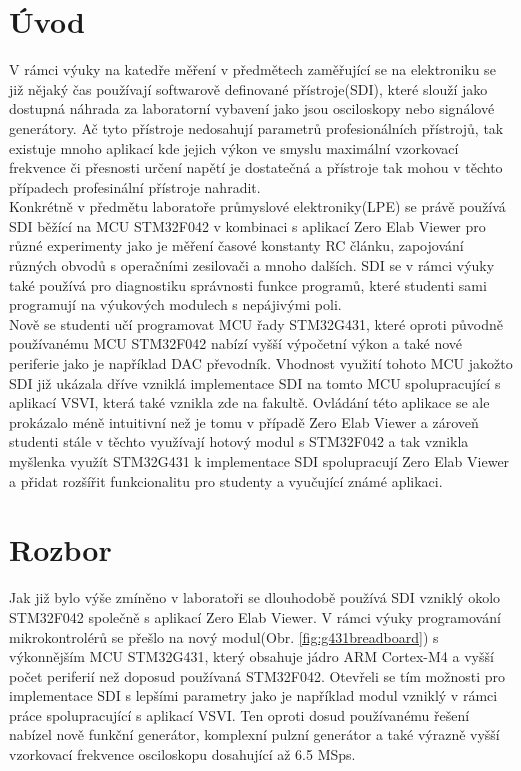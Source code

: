 
\chapter{Úvod}
V rámci výuky na katedře měření v předmětech zaměřující se na elektroniku se již nějaký čas používají softwarově definované přístroje(SDI), které slouží jako dostupná náhrada za laboratorní vybavení jako jsou osciloskopy nebo signálové generátory. Ač tyto přístroje nedosahují parametrů profesionálních přístrojů, tak existuje mnoho aplikací kde jejich výkon ve smyslu maximální vzorkovací frekvence či přesnosti určení napětí je dostatečná a přístroje tak mohou v těchto případech profesinální přístroje nahradit.\\

Konkrétně v předmětu laboratoře průmyslové elektroniky(LPE) se právě používá SDI běžící na MCU STM32F042 v kombinaci s aplikací Zero Elab Viewer pro různé experimenty jako je měření časové konstanty RC článku, zapojování různých obvodů s operačními zesilovači a mnoho dalších. SDI se v rámci výuky také používá pro diagnostiku správnosti funkce programů, které studenti sami programují na výukových modulech s nepájivými poli.\\

Nově se studenti učí programovat MCU řady STM32G431, které oproti původně používanému MCU STM32F042 nabízí vyšší výpočetní výkon a také nové periferie jako je například DAC převodník. Vhodnost využití tohoto MCU jakožto SDI již ukázala dříve vzniklá implementace SDI na tomto MCU spolupracující s aplikací VSVI, která také vznikla zde na fakultě. Ovládání této aplikace se ale prokázalo méně intuitivní než je tomu v případě Zero Elab Viewer a zároveň studenti stále v těchto využívají hotový modul s STM32F042 a tak vznikla myšlenka využít STM32G431 k implementace SDI spolupracují Zero Elab Viewer a přidat rozšířit funkcionalitu pro studenty a vyučující známé aplikaci.


\chapter{Rozbor}
Jak již bylo výše zmíněno v laboratoři se dlouhodobě používá SDI vzniklý okolo STM32F042 společně s aplikací Zero Elab Viewer. V rámci výuky programování mikrokontrolérů se přešlo na nový modul(Obr. \ref{fig:g431breadboard}) s výkonnějším MCU STM32G431, který obsahuje jádro ARM Cortex-M4 a vyšší počet periferií než doposud používaná STM32F042. Otevřeli se tím možnosti pro implementace SDI s lepšími parametry jako je například modul vzniklý v rámci práce \cite{DujavaDIP} spolupracující s aplikací VSVI. Ten oproti dosud používanému řešení nabízel nově funkční generátor, komplexní pulzní generátor a také výrazně vyšší vzorkovací frekvence osciloskopu dosahující až 6.5 MSps.

